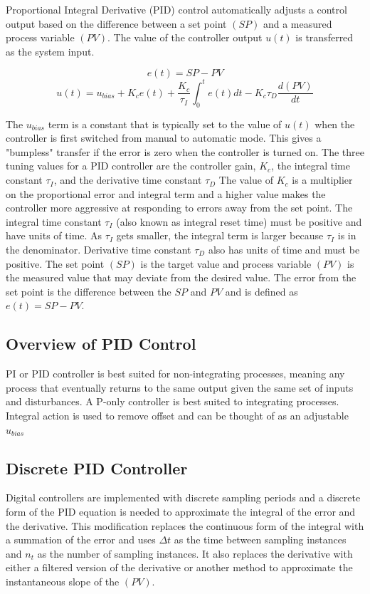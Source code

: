 Proportional Integral Derivative (PID) control automatically adjusts a control output based on the difference between a set point $(SP)$ and a measured process variable $(PV)$. The value of the controller output $u(t)$  is transferred as the system input.

\[e(t) = SP - PV\]
\[    u(t) = u_{bias} + K_c e(t) + \frac{K_c}{\tau_I} \int_{0}^{t} e(t) dt - K_c \tau_D \frac{d(PV)}{dt} \]

The $u_{bias}$ term is a constant that is typically set to the value of $u(t)$ when the controller is first switched from manual to automatic mode. This gives a "bumpless" transfer if the error is zero when the controller is turned on. The three tuning values for a PID controller are the controller gain, $K_c$, the integral time constant $\tau_I$, and the derivative time constant $\tau_D$  The value of $K_c$ is a multiplier on the proportional error and integral term and a higher value makes the controller more aggressive at responding to errors away from the set point. The integral time constant $\tau_I$ (also known as integral reset time) must be positive and have units of time. As $\tau_I$  gets smaller, the integral term is larger because $\tau_I$ is in the denominator. Derivative time constant $\tau_D$ also has units of time and must be positive. The set point $(SP)$ is the target value and process variable $(PV)$ is the measured value that may deviate from the desired value. The error from the set point is the difference between the $SP$ and $PV$ and is defined as  $e(t) = SP - PV$.

\subsection{Overview of PID Control}
PI or PID controller is best suited for non-integrating processes, meaning any process that eventually returns to the same output given the same set of inputs and disturbances. A P-only controller is best suited to integrating processes. Integral action is used to remove offset and can be thought of as an adjustable $u_{bias}$ 

\subsection{Discrete PID Controller}

Digital controllers are implemented with discrete sampling periods and a discrete form of the PID equation is needed to approximate the integral of the error and the derivative. This modification replaces the continuous form of the integral with a summation of the error and uses $\Delta t$ as the time between sampling instances and $n_t$ as the number of sampling instances. It also replaces the derivative with either a filtered version of the derivative or another method to approximate the instantaneous slope of the $(PV)$. 


